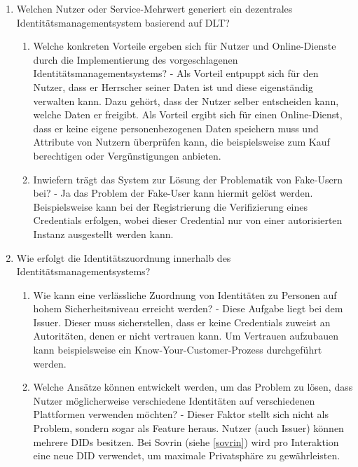 \begin{enumerate}
\begin{enumerate}
\begin{itemize}
		\end{itemize}
		 
	\end{enumerate}
	
	\item Welchen Nutzer oder Service-Mehrwert generiert ein dezentrales Identitätsmanagementsystem basierend auf DLT?
	\begin{enumerate}
		
		\item Welche konkreten Vorteile ergeben sich für Nutzer und Online-Dienste durch die Implementierung des vorgeschlagenen Identitätsmanagementsystems? - Als Vorteil entpuppt sich für den Nutzer, dass er Herrscher seiner Daten ist und diese eigenständig verwalten kann. Dazu gehört, dass der Nutzer selber entscheiden kann, welche Daten er freigibt. Als Vorteil ergibt sich für einen Online-Dienst, dass er keine eigene personenbezogenen Daten speichern muss und Attribute von Nutzern überprüfen kann, die beispielsweise zum Kauf berechtigen oder Vergünstigungen anbieten.
		
		\item Inwiefern trägt das System zur Lösung der Problematik von Fake-Usern bei? - Ja das Problem der Fake-User kann hiermit gelöst werden. Beispielsweise kann bei der Registrierung die Verifizierung eines Credentials erfolgen, wobei dieser Credential nur von einer autorisierten Instanz ausgestellt werden kann.
	\end{enumerate}
	
	\item Wie erfolgt die Identitätszuordnung innerhalb des Identitätsmanagementsystems?
	
	\begin{enumerate}
		\item Wie kann eine verlässliche Zuordnung von Identitäten zu Personen auf hohem Sicherheitsniveau erreicht werden? - Diese Aufgabe liegt bei dem Issuer. Dieser muss sicherstellen, dass er keine Credentials zuweist an Autoritäten, denen er nicht vertrauen kann. Um Vertrauen aufzubauen kann beispielsweise  ein Know-Your-Customer-Prozess durchgeführt werden.
		
		\item Welche Ansätze können entwickelt werden, um das Problem zu lösen, dass Nutzer möglicherweise verschiedene Identitäten auf verschiedenen Plattformen verwenden möchten? - Dieser Faktor stellt sich nicht als Problem, sondern sogar als Feature heraus. Nutzer (auch Issuer) können mehrere DIDs besitzen. Bei Sovrin (siehe \ref{sovrin}) wird pro Interaktion eine neue DID verwendet, um maximale Privatsphäre zu gewährleisten.
		

\end{enumerate}
\end{enumerate}
